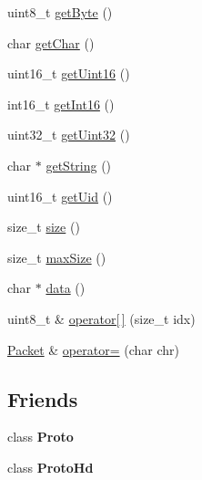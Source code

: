 \begin{DoxyCompactItemize}
\item 
uint8\+\_\+t \hyperlink{classTiny_1_1Packet_a152feac05d3e972f614c17c36bf30513}{get\+Byte} ()
\item 
char \hyperlink{classTiny_1_1Packet_a260645f9d055da878f149a13ecd58844}{get\+Char} ()
\item 
uint16\+\_\+t \hyperlink{classTiny_1_1Packet_a71765e73adfbc67138f75c2b8ea7d74c}{get\+Uint16} ()
\item 
int16\+\_\+t \hyperlink{classTiny_1_1Packet_a7dfed04418564f93dd4d2b4e9144a861}{get\+Int16} ()
\item 
uint32\+\_\+t \hyperlink{classTiny_1_1Packet_a5dd4b89cb7224b62d4f0328c8e40f38f}{get\+Uint32} ()
\item 
char $\ast$ \hyperlink{classTiny_1_1Packet_a8bc9a3b3f41be292f9c5ac566afeb04b}{get\+String} ()
\item 
uint16\+\_\+t \hyperlink{classTiny_1_1Packet_a5333df49a8becff438d3e36b0ca8d3f0}{get\+Uid} ()
\item 
size\+\_\+t \hyperlink{classTiny_1_1Packet_a872f81d4ad35e49b232101c7c12e34f2}{size} ()
\item 
size\+\_\+t \hyperlink{classTiny_1_1Packet_ac6545b3b5df97d5f1ea1a15abc0570ed}{max\+Size} ()
\item 
char $\ast$ \hyperlink{classTiny_1_1Packet_a3307ba504caba9c5eee8f1f32cf1a749}{data} ()
\item 
uint8\+\_\+t \& \hyperlink{classTiny_1_1Packet_abfaef504eb88a4db88bca3b907770fa2}{operator\mbox{[}$\,$\mbox{]}} (size\+\_\+t idx)
\item 
\hyperlink{classTiny_1_1Packet}{Packet} \& \hyperlink{classTiny_1_1Packet_a2de2c7f2c3ea6baaab462dd7e4469ecb}{operator=} (char chr)
\end{DoxyCompactItemize}
\subsection*{Friends}
\begin{DoxyCompactItemize}
\item 
\hypertarget{classTiny_1_1Packet_a45bd055fddab40aaf0c60bfb9e21aa6f}{}class {\bfseries Proto}\label{classTiny_1_1Packet_a45bd055fddab40aaf0c60bfb9e21aa6f}

\item 
\hypertarget{classTiny_1_1Packet_a7f90e063a34c3417ed1ea25e64608857}{}class {\bfseries Proto\+Hd}\label{classTiny_1_1Packet_a7f90e063a34c3417ed1ea25e64608857}

\end{DoxyCompactItemize}


